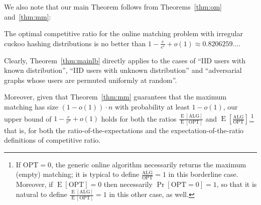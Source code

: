 \documentclass[11pt]{article}
\DeclareMathOperator*{\E}{E}
\begin{document}
We also note that our main Theorem follows from Theorems~\ref{thm:om} and~\ref{thm:mm}:
\begin{theorem}\label{thm:mainlb}
The optimal competitive ratio for the online matching problem with irregular cuckoo hashing  distributions is no better than $1 - \frac e{e^e} + o(1) \approx 0.8206259\ldots$.
\end{theorem}
Clearly, Theorem~\ref{thm:mainlb} directly applies to the cases of ``IID users with known distribution'', ``IID users with unknown distribution'' and ``adversarial graphs whose users are permuted uniformly at random''.

\smallskip

Moreover, given that Theorem~\ref{thm:mm} guarantees that the maximum matching has size $(1-o(1)) \cdot n$ with probability at least $1-o(1)$, our upper bound of $1-\frac{e}{e^e} + o(1)$ holds for both the ratios $\frac{\E[\text{ALG}]}{\E[\text{OPT}]}$ and $\E\left[\frac{\text{ALG}}{\text{OPT}}\right]$,\footnote{If $\text{OPT} = 0$, the generic online algorithm  necessarily returns the maximum (empty) matching;  it is typical to define $\frac{\text{ALG}}{\text{OPT}} = 1$ in this borderline case. Moreover, if $\E[\text{OPT}] = 0$ then necessarily $\Pr[\text{OPT} = 0] = 1$,  so that it is natural to define $\frac{\E[\text{ALG}]}{\E[\text{OPT}]} = 1$ in this other case, as well.}  that is, for both the ratio-of-the-expectations and the expectation-of-the-ratio definitions of competitive ratio.
\end{document}
